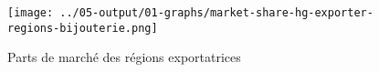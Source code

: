 \documentclass[french,10pt,a4paper]{article}
\begin{document}
\begin{figure}[!h]
  \centering \texttt{[image: ../05-output/01-graphs/market-share-hg-exporter-regions-bijouterie.png]}
  \caption{Parts de marché des régions exportatrices}
  \label{fig:market-share-hg-exporter-regions-bijouterie}
\end{figure}






\newpage


\end{document}
